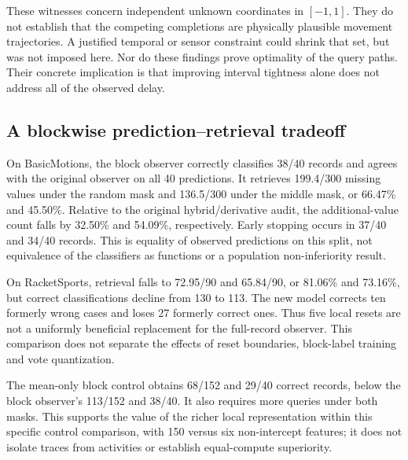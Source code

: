 \documentclass[11pt,a4paper]{article}
\theoremstyle{definition}\newtheorem{definition}[theorem]{Definition}
\begin{document}
These witnesses concern independent unknown coordinates in $[-1,1]$. They do not establish that the competing completions are physically plausible movement trajectories. A justified temporal or sensor constraint could shrink that set, but was not imposed here. Nor do these findings prove optimality of the query paths. Their concrete implication is that improving interval tightness alone does not address all of the observed delay.

\subsection{A blockwise prediction--retrieval tradeoff}
\begin{table}[!htbp]\centering\small
\caption{Different complete-record classifiers on the same external splits and missing masks. Retrieval columns give mean missing scalars read, out of 90 or 300. Full-record affine uses the decision-focused policy. Block models use strict integer vote dominance with validated local winners. Each audit preserves its own classifier.}
\label{tab:blockresults}
\end{table}
On BasicMotions, the block observer correctly classifies 38/40 records and agrees with the original observer on all 40 predictions. It retrieves 199.4/300 missing values under the random mask and 136.5/300 under the middle mask, or 66.47\% and 45.50\%. Relative to the original hybrid/derivative audit, the additional-value count falls by 32.50\% and 54.09\%, respectively. Early stopping occurs in 37/40 and 34/40 records. This is equality of observed predictions on this split, not equivalence of the classifiers as functions or a population non-inferiority result.

On RacketSports, retrieval falls to 72.95/90 and 65.84/90, or 81.06\% and 73.16\%, but correct classifications decline from 130 to 113. The new model corrects ten formerly wrong cases and loses 27 formerly correct ones. Thus five local resets are not a uniformly beneficial replacement for the full-record observer. This comparison does not separate the effects of reset boundaries, block-label training and vote quantization.

The mean-only block control obtains 68/152 and 29/40 correct records, below the block observer's 113/152 and 38/40. It also requires more queries under both masks. This supports the value of the richer local representation within this specific control comparison, with 150 versus six non-intercept features; it does not isolate traces from activities or establish equal-compute superiority.
\end{document}
